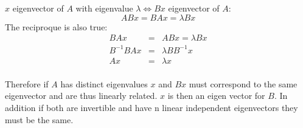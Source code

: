 \documentclass{article}
\begin{document}
\(x\) eigenvector of \(A\) with eigenvalue \(\lambda \Leftrightarrow B x \) eigenvector of \(A\):
\[A B x = B A x = \lambda B x \]
The reciproque is also true:
\begin{eqnarray*}
B A x &=& A B x = \lambda B x \\
B^{-1} B A x &=&  \lambda B B^{-1} x \\
A x &=&  \lambda x \\
\end{eqnarray*}

Therefore if \(A\) has distinct eigenvalues \(x\) and \(Bx\) must correspond to the same eigenvector
and are thus linearly related. \(x\) is then an eigen vector for \(B\).
In addition if both are invertible and have n linear independent eigenvectors they must be the same.




\end{document}

